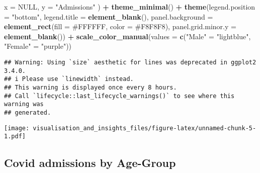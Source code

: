\documentclass[
]{article}
\newenvironment{Shaded}{\begin{snugshade}}{\end{snugshade}}
\newcommand{\AttributeTok}[1]{\textcolor[rgb]{0.13,0.29,0.53}{#1}}
\newcommand{\ConstantTok}[1]{\textcolor[rgb]{0.56,0.35,0.01}{#1}}
\newcommand{\FunctionTok}[1]{\textcolor[rgb]{0.13,0.29,0.53}{\textbf{#1}}}
\newcommand{\NormalTok}[1]{#1}
\newcommand{\OtherTok}[1]{\textcolor[rgb]{0.56,0.35,0.01}{#1}}
\newcommand{\SpecialCharTok}[1]{\textcolor[rgb]{0.81,0.36,0.00}{\textbf{#1}}}
\newcommand{\StringTok}[1]{\textcolor[rgb]{0.31,0.60,0.02}{#1}}
\begin{document}
\begin{Shaded}
\begin{Highlighting}[]
           \AttributeTok{x        =} \ConstantTok{NULL}\NormalTok{, }
           \AttributeTok{y        =} \StringTok{"Admissions"}
\NormalTok{      ) }\SpecialCharTok{+}
      \FunctionTok{theme\_minimal}\NormalTok{() }\SpecialCharTok{+}
      \FunctionTok{theme}\NormalTok{(}\AttributeTok{legend.position =} \StringTok{"bottom"}\NormalTok{,}
            \AttributeTok{legend.title =} \FunctionTok{element\_blank}\NormalTok{(),}
            \AttributeTok{panel.background =} \FunctionTok{element\_rect}\NormalTok{(}\AttributeTok{fill =} \StringTok{\textquotesingle{}\#FFFFFF\textquotesingle{}}\NormalTok{, }\AttributeTok{color =} \StringTok{\textquotesingle{}\#F8F8F8\textquotesingle{}}\NormalTok{),}
            \AttributeTok{panel.grid.minor.y =} \FunctionTok{element\_blank}\NormalTok{()) }\SpecialCharTok{+}
      \FunctionTok{scale\_color\_manual}\NormalTok{(}\AttributeTok{values =} \FunctionTok{c}\NormalTok{(}\StringTok{"Male"}   \OtherTok{=} \StringTok{"lightblue"}\NormalTok{,}
                                    \StringTok{"Female"} \OtherTok{=} \StringTok{"purple"}\NormalTok{))}
\end{Highlighting}
\end{Shaded}

\begin{verbatim}
## Warning: Using `size` aesthetic for lines was deprecated in ggplot2 3.4.0.
## i Please use `linewidth` instead.
## This warning is displayed once every 8 hours.
## Call `lifecycle::last_lifecycle_warnings()` to see where this warning was
## generated.
\end{verbatim}

\texttt{[image: visualisation\_and\_insights\_files/figure-latex/unnamed-chunk-5-1.pdf]}

\hypertarget{covid-admissions-by-age-group}{%
\subsection{Covid admissions by
Age-Group}\label{covid-admissions-by-age-group}}
\end{document}
